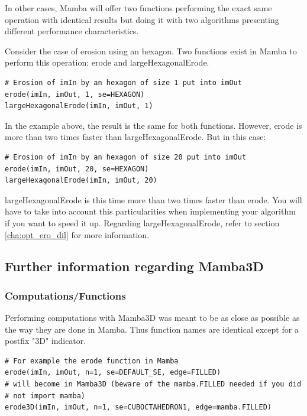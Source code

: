\documentclass[a4paper,10pt,oneside]{article}
\begin{document}
In other cases, Mamba will offer two functions performing the exact same 
operation with identical results but doing it with two algorithms presenting
different performance characteristics.

Consider the case of erosion using an hexagon. Two functions exist in Mamba to
perform this operation: erode and largeHexagonalErode.

\lstset{language=Python}
\begin{lstlisting}
# Erosion of imIn by an hexagon of size 1 put into imOut
erode(imIn, imOut, 1, se=HEXAGON)
largeHexagonalErode(imIn, imOut, 1)
\end{lstlisting}

In the example above, the result is the same for both functions. However, erode is
more than two times faster than largeHexagonalErode. But in this case:

\lstset{language=Python}
\begin{lstlisting}
# Erosion of imIn by an hexagon of size 20 put into imOut
erode(imIn, imOut, 20, se=HEXAGON)
largeHexagonalErode(imIn, imOut, 20)
\end{lstlisting}

largeHexagonalErode is this time more than two times faster than erode. You will
have to take into account this particularities when implementing your algorithm
if you want to speed it up. Regarding largeHexagonalErode, refer to section 
\ref{cha:opt_ero_dil} for more information.

\pagebreak

\subsection{Further information regarding Mamba3D}

\subsubsection{Computations/Functions}

Performing computations with Mamba3D was meant to be as close as possible
as the way they are done in Mamba. Thus function names are identical except
for a postfix "3D" indicator.

\lstset{language=Python}
\begin{lstlisting}
# For example the erode function in Mamba
erode(imIn, imOut, n=1, se=DEFAULT_SE, edge=FILLED)
# will become in Mamba3D (beware of the mamba.FILLED needed if you did 
# not import mamba)
erode3D(imIn, imOut, n=1, se=CUBOCTAHEDRON1, edge=mamba.FILLED)
\end{lstlisting}
\end{document}
